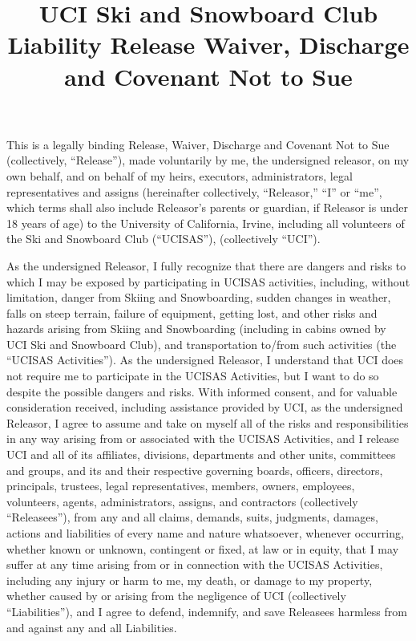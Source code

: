 \documentclass{article}
\title{UCI Ski and Snowboard Club\\Liability Release Waiver, Discharge and Covenant Not to Sue}
\begin{document}
\maketitle

This is a legally binding Release, Waiver, Discharge and Covenant Not to Sue
(collectively, ``Release''), made voluntarily by me, the undersigned releasor,
on my own behalf, and on behalf of my heirs, executors, administrators, legal
representatives and assigns (hereinafter collectively, ``Releasor,'' ``I'' or
``me'', which terms shall also include Releasor's parents or guardian, if
Releasor is under 18 years of age) to the University of California, Irvine,
including all volunteers of the Ski and Snowboard Club (``UCISAS''), (collectively ``UCI'').

As the undersigned Releasor, I fully recognize that there are dangers and risks
to which I may be exposed by participating in UCISAS activities, including,
without limitation, danger from Skiing and Snowboarding, sudden changes in weather,
falls on steep terrain, failure of equipment, getting lost, and other risks and hazards
arising from Skiing and Snowboarding (including in cabins owned by UCI Ski and Snowboard
Club), and transportation to/from such activities (the ``UCISAS Activities''). As the
undersigned Releasor, I understand that UCI does not require me to participate in the
UCISAS Activities, but I want to do so despite the possible dangers and risks. With
informed consent, and for valuable consideration received, including assistance provided
by UCI, as the undersigned Releasor, I agree to assume and take on myself all of the
risks and responsibilities in any way arising from or associated with the UCISAS
Activities, and I release UCI and all of its affiliates, divisions, departments
and other units, committees and groups, and its and their respective governing
boards, officers, directors, principals, trustees, legal representatives,
members, owners, employees, volunteers, agents, administrators, assigns, and
contractors (collectively ``Releasees''), from any and all claims, demands,
suits, judgments, damages, actions and liabilities of every name and nature
whatsoever, whenever occurring, whether known or unknown, contingent or fixed,
at law or in equity, that I may suffer at any time arising from or in
connection with the UCISAS Activities, including any injury or harm to me, my
death, or damage to my property, whether caused by or arising from the
negligence of UCI (collectively ``Liabilities''), and I agree to defend,
indemnify, and save Releasees harmless from and against any and all
Liabilities.
\end{document}
